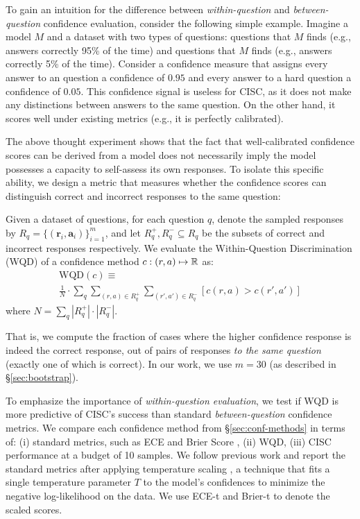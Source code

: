 To gain an intuition for the difference between \emph{within-question}
and \emph{between-question} confidence evaluation, consider the following simple example. Imagine a model $M$ and a dataset with two types of questions: questions that $M$ finds  (e.g., answers correctly 95\% of the time) and questions that $M$ finds  (e.g., answers correctly 5\% of the time). Consider a confidence measure that assigns every answer to an  question a confidence of $0.95$ and every answer to a hard question a confidence of $0.05$. This confidence signal is useless for CISC, as it does not make any distinctions between answers to the same question. On the other hand, it scores well under existing metrics (e.g., it is perfectly calibrated).

The above thought experiment shows that the fact that well-calibrated confidence scores can be derived from a model does not necessarily imply the model possesses a capacity to self-assess its own responses. To isolate this specific ability, we design a metric that measures whether the confidence scores can distinguish correct and incorrect responses to the same question:

\begin{definition}
\label{def:wqd}
Given a dataset of questions, for each question $q$, denote the sampled responses by $R_q = \{(\textbf{r}_i, \textbf{a}_i)\}_{i=1}^m$, and let $R^+_q,R^-_q \subseteq R_q$ be the subsets of correct and incorrect responses respectively. We evaluate the Within-Question Discrimination (WQD) of a confidence method $c: (r,a) \mapsto \mathbb{R}$ as:
\begin{multline*}
    \text{WQD}(c) \equiv \\ 
    \frac{1}{N} \cdot \sum_{q} \sum_{(r, a)\in R^+_q} \sum_{(r', a')\in R^-_q} [c(r,a) > c(r',a')]
\end{multline*}
where $N = \sum_q |R_q^+| \cdot |R_q^-|$.
\end{definition}

That is, we compute the fraction of cases where the higher confidence response is indeed the correct response, out of pairs of responses \emph{to the same question} (exactly one of which is correct). In our work, we use $m = 30$ (as described in \S\ref{sec:bootstrap}).

To emphasize the importance of \emph{within-question evaluation}, we test if WQD is more predictive of CISC's success than standard \emph{between-question} confidence metrics. We compare each confidence method from \S\ref{sec:conf-methods} in terms of: (i) standard metrics, such as ECE \cite{pmlr-v70-guo17a} and Brier Score \cite{brier1950verification}, (ii) WQD, (iii) CISC performance at a budget of 10 samples. We follow previous work \cite{tyen2023llms} and report the standard metrics after applying temperature scaling \cite{ovadia2019can}, a technique that fits a single temperature parameter $T$ to the model's confidences to minimize the negative log-likelihood on the data. We use ECE-t and Brier-t to denote the scaled scores.

